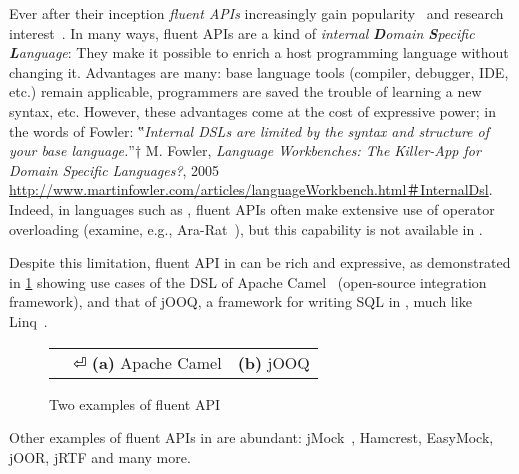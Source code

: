 
Ever after their inception \emph{fluent APIs}
  increasingly gain popularity~\cite{Hibernate:06,Freeman:Pryce:06,Larsen:2012} and research
  interest~\cite{Deursen:2000,Kabanov:2008}.
In many ways, fluent APIs are a kind of
  \emph{internal} \emph{\textbf Domain \textbf Specific \textbf Language}:
They make it possible to enrich a host programming language without changing it.
Advantages are many: base language tools (compiler, debugger, IDE, etc.) remain
  applicable, programmers are saved the trouble of learning a new syntax, etc.
However, these advantages come at the cost of expressive power;
  in the words of Fowler:
  ‟\emph{Internal DSLs are limited by the syntax and structure of your base language.}”†
  {M. Fowler, \emph{Language Workbenches: The Killer-App for Domain Specific Languages?},
    2005
    \newline
  \url{http://www.martinfowler.com/articles/languageWorkbench.html＃InternalDsl}}.
Indeed, in languages such as \CC, fluent APIs
  often make extensive use of operator overloading (examine, e.g., \textsf{Ara-Rat}~\cite{Gil:Lenz:07}),
  but this capability is not available in \Java.

Despite this limitation, fluent API in \Java can be rich and expressive, as demonstrated
  in \cref{Figure:DSL} showing use cases of the DSL of Apache Camel~\cite{Ibsen:Anstey:10}
(open-source integration framework),
and that of jOOQ, a framework for writing
  SQL in \Java, much like Linq~\cite{Meijer:Beckman:Bierman:06}.

\begin{figure}[H]
  \caption{\label{Figure:DSL} Two examples of \Java fluent API}
  \begin{tabular}{@{}c@{}c@{}}
    \parbox[c]{44ex}{} &
    \hspace{-3ex} \parbox[c]{59ex}{}⏎
    \textbf{(a)} Apache Camel & \textbf{(b)} jOOQ
  \end{tabular}
\end{figure}

Other examples of fluent APIs in \Java are abundant:
  jMock~\cite{Freeman:Pryce:06},
  Hamcrest,
  EasyMock,
  jOOR,
  jRTF
  and many more.

